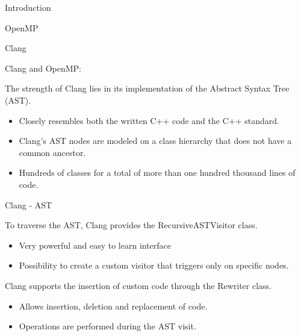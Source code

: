\documentclass[xcolor=dvipsnames]{beamer}
\begin{document}
\begin{section}{Introduction}
\begin{frame}{\hskip 0.3cm OpenMP}
\begin{figure}
\end{figure}

\end{frame}














\begin{frame}{\hskip 0.3cm Clang}

Clang and OpenMP:

The strength of Clang lies in its implementation of the Abstract Syntax Tree (AST).
\begin{itemize}

\item Closely resembles both the written C++ code and the C++ standard.

\item Clang’s AST nodes are modeled on a class hierarchy that does not have a common ancestor.

\item Hundreds of classes for a total of more than one hundred thousand lines of code.

\end{itemize}
\end{frame}










\begin{frame}{\hskip 0.3cm Clang - AST}

To traverse the AST, Clang provides the RecursiveASTVisitor class.
\begin{itemize}

\item Very powerful and easy to learn interface

\item Possibility to create a custom visitor that triggers only on specific nodes.


\end{itemize}

Clang supports the insertion of custom code through the Rewriter class.
\begin{itemize}

\item Allows insertion, deletion and replacement of code.

\item Operations are performed during the AST visit.


\end{itemize}
\end{frame}
\end{section}
\end{document}
